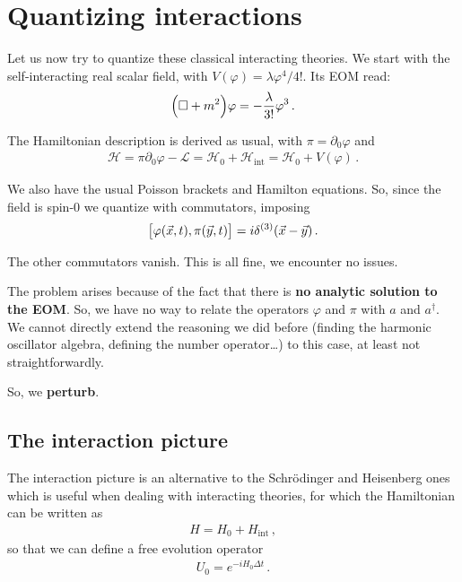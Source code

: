 \documentclass[main.tex]{subfiles}
\begin{document}
\section{Quantizing interactions}

Let us now try to quantize these classical interacting theories. 
We start with the self-interacting real scalar field, with \(V(\varphi ) = \lambda \varphi^{4} / 4! \). Its EOM read: 
%
\begin{align}
\qty(\square + m^2) \varphi = - \frac{\lambda}{3!} \varphi^3
\,.
\end{align}

The Hamiltonian description is derived as usual, with \(\pi = \partial_0 \varphi \) and 
%
\begin{align}
\mathscr{H} =  \pi \partial_0 \varphi 
- \mathscr{L} =  \mathscr{H}_{0} + \mathscr{H} _{\text{int}}
= \mathscr{H}_{0} + V(\varphi )
\,.
\end{align}

We also have the usual Poisson brackets and Hamilton equations. 
So, since the field is spin-0 we quantize with commutators, imposing 
%
\begin{align}
\qty[\varphi (\vec{x}, t) , \pi (\vec{y}, t)] = i \delta^{(3)} (\vec{x}-\vec{y})
\,.
\end{align}

The other commutators vanish. 
This is all fine, we encounter no issues.

The problem arises because of the fact that there is \textbf{no analytic solution to the EOM}. 
So, we have no way to relate the operators \(\varphi \) and \(\pi \) with \(a\) and \(a ^\dag\). We cannot directly extend the reasoning we did before (finding the harmonic oscillator algebra, defining the number operator\dots) to this case, at least not straightforwardly. 

So, we \textbf{perturb}. 

\subsection{The interaction picture}

The interaction picture is an alternative to the Schrödinger and Heisenberg ones which is useful when dealing with interacting theories, for which the Hamiltonian can be written as 
%
\begin{align}
H = H_0 + H _{\text{int}}
\,,
\end{align}
%
so that we can define a free evolution operator 
%
\begin{align}
U_0 = e^{-i H_0 \Delta t}
\,.
\end{align}
\end{document}

